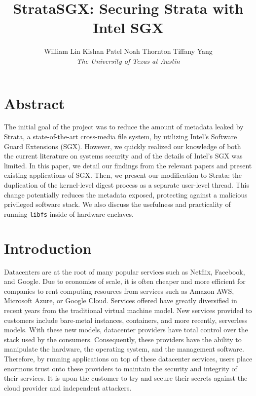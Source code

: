 \documentclass[letterpaper,twocolumn,10pt]{article}
\begin{document}
\date{}

\title{\Large \bf StrataSGX: Securing Strata with Intel SGX}

\author{
{\rm William Lin}
\qquad
{\rm Kishan Patel}
\qquad
{\rm Noah Thornton}
\qquad
{\rm Tiffany Yang}
    \vspace{2pt}\\
\emph{The University of Texas at Austin}
} %

\maketitle

\section{Abstract}

The initial goal of the project was to reduce the amount of metadata leaked by
Strata, a state-of-the-art cross-media file system, by utilizing Intel's
Software Guard Extensions (SGX). However, we quickly realized our knowledge of
both the current literature on systems security and of the details of Intel's
SGX was limited. In this paper, we detail our findings from the relevant
papers and present existing applications of SGX.  Then, we present our
modification to Strata: the duplication of the kernel-level digest process as
a separate user-level thread. This change potentially reduces the metadata exposed, 
protecting against a malicious privileged software stack. We also discuss the
usefulness and practicality of running \verb|libfs| inside of hardware
enclaves.


\section{Introduction}

Datacenters are at the root of many popular services such as Netflix, Facebook,
and Google. Due to economies of scale, it is often cheaper and more
efficient for companies to rent computing resources from services such as
Amazon AWS, Microsoft Azure, or Google Cloud. Services offered have greatly
diversified in recent years from the traditional virtual machine model. New
services provided to customers include bare-metal instances, containers, and more 
recently, serverless models. With these new models, datacenter providers
have total control over the stack used by the consumers.  Consequently, these
providers have the ability to manipulate the hardware, the operating system,
and the management software.  Therefore, by running applications on top of these
datacenter services, users place enormous trust onto these providers to
maintain the security and integrity of their services. It is upon the
customer to try and secure their secrets against the cloud provider and
independent attackers.
\end{document}
